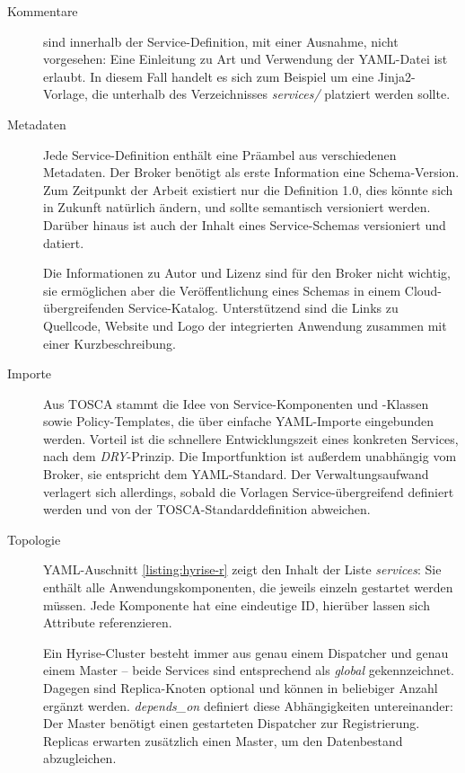\begin{description}
	
	\item[Kommentare] sind innerhalb der Service-Definition, mit einer Ausnahme, nicht vorgesehen: Eine Einleitung zu Art und Verwendung der YAML-Datei ist erlaubt. In diesem Fall handelt es sich zum Beispiel um eine Jinja2-Vorlage, die unterhalb des Verzeichnisses \emph{services/} platziert werden sollte.
	
	\item[Metadaten] Jede Service-Definition enthält eine Präambel aus verschiedenen Metadaten. Der Broker benötigt als erste Information eine Schema-Version. Zum Zeitpunkt der Arbeit existiert nur die Definition 1.0, dies könnte sich in Zukunft natürlich ändern, und sollte semantisch versioniert werden. Darüber hinaus ist auch der Inhalt eines Service-Schemas versioniert und datiert. 
	
	Die Informationen zu Autor und Lizenz sind für den Broker nicht wichtig, sie ermöglichen aber die Veröffentlichung eines Schemas in einem Cloud-übergreifenden Service-Katalog. Unterstützend sind die Links zu Quellcode, Website und Logo der integrierten Anwendung zusammen mit einer Kurzbeschreibung.

	\item[Importe] Aus TOSCA stammt die Idee von Service-Komponenten und -Klassen sowie Policy-Templates, die über einfache YAML-Importe eingebunden werden. Vorteil ist die schnellere Entwicklungszeit eines konkreten Services, nach dem \emph{DRY}-Prinzip. Die Importfunktion ist außerdem unabhängig vom Broker, sie entspricht dem YAML-Standard. Der Verwaltungsaufwand verlagert sich allerdings, sobald die Vorlagen Service-übergreifend definiert werden und von der TOSCA-Standarddefinition abweichen.
	
	\item[Topologie] YAML-Auschnitt \autoref{listing:hyrise-r} zeigt den Inhalt der Liste \emph{services}: Sie enthält alle Anwendungskomponenten, die jeweils einzeln gestartet werden müssen. Jede Komponente hat eine eindeutige ID, hierüber lassen sich Attribute referenzieren.
	
	Ein Hyrise-Cluster besteht immer aus genau einem Dispatcher und genau einem Master -- beide Services sind entsprechend als \emph{global} gekennzeichnet. Dagegen sind Replica-Knoten optional und können in beliebiger Anzahl ergänzt werden. \emph{depends\_on} definiert diese Abhängigkeiten untereinander: Der Master benötigt einen gestarteten Dispatcher zur Registrierung. Replicas erwarten zusätzlich einen Master, um den Datenbestand abzugleichen.	
	

\end{description}
